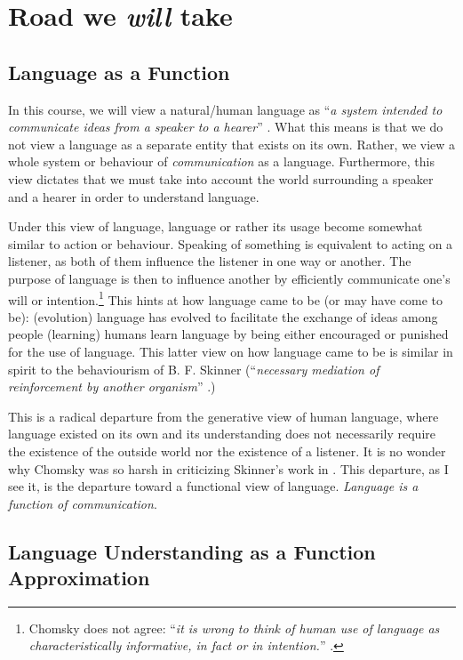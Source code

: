 \documentclass{report}
\begin{document}
\section{Road we {\it will} take}
\label{sec:intro}

\subsection{Language as a Function}

In this course, we will view a natural/human language as ``{\it a system
intended to communicate ideas from a speaker to a hearer}''
\cite{winograd1972understanding}. What this means is that we do not view a
language as a separate entity that exists on its own. Rather, we view a whole
system or behaviour of {\it communication} as a language. Furthermore, this view
dictates that we must take into account the world surrounding a speaker and a
hearer in order to understand language.

Under this view of language, language or rather its usage become somewhat
similar to action or behaviour. Speaking of something is equivalent to acting on
a listener, as both of them influence the listener in one way or another. The
purpose of language is then to influence another by efficiently communicate
one's will or intention.\footnote{
    Chomsky does not agree: ``{\it it is wrong to think of human use of language
    as characteristically informative, in fact or in intention.}''
    \cite{chomsky1968linguistic}.
} This hints at how language came to be (or may have come to be): (evolution)
language has evolved to facilitate the exchange of ideas among people (learning)
humans learn language by being either encouraged or punished for the use of
language. This latter view on how language came to be is similar in spirit to
the behaviourism of B. F. Skinner (``{\it necessary mediation of reinforcement by
another organism}'' \cite{skinner2014verbal}.)

This is a radical departure from the generative view of human language, where
language existed on its own and its understanding does not necessarily require
the existence of the outside world nor the existence of a listener. It is no
wonder why Chomsky was so harsh in criticizing Skinner's work in
\cite{chomsky1959review}. 
This departure, as I see it, is the departure toward a functional view of
language. {\it Language is a function of communication}. 

\subsection{Language Understanding as a Function Approximation}
\end{document}
